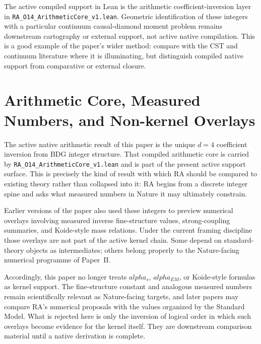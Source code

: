 \documentclass[11pt]{article}
\def\alpha{alpha}%
\def\mathrm#1{#1}%
\begin{document}
The active compiled support in Lean is the arithmetic coefficient-inversion layer in \texttt{RA\_O14\_ArithmeticCore\_v1.lean}. Geometric identification of these integers with a particular continuum causal-diamond moment problem remains downstream cartography or external support, not active native compilation. This is a good example of the paper's wider method: compare with the CST and continuum literature where it is illuminating, but distinguish compiled native support from comparative or external closure.

\section{Arithmetic Core, Measured Numbers, and Non-kernel Overlays}
\label{sec:couplings}

The active native arithmetic result of this paper is the unique $d=4$ coefficient inversion from BDG integer structure. That compiled arithmetic core is carried by \texttt{RA\_O14\_ArithmeticCore\_v1.lean} and is part of the present active support surface. This is precisely the kind of result with which RA should be compared to existing theory rather than collapsed into it: RA begins from a discrete integer spine and asks what measured numbers in Nature it may ultimately constrain.

Earlier versions of the paper also used these integers to preview numerical overlays involving measured inverse fine-structure values, strong-coupling summaries, and Koide-style mass relations. Under the current framing discipline those overlays are not part of the active kernel chain. Some depend on standard-theory objects as intermediates; others belong properly to the Nature-facing numerical programme of Paper~II.

Accordingly, this paper no longer treats $\alpha_s$, $\alpha_{\mathrm{EM}}$, or Koide-style formulas as kernel support. The fine-structure constant and analogous measured numbers remain scientifically relevant as Nature-facing targets, and later papers may compare RA's numerical proposals with the values organized by the Standard Model. What is rejected here is only the inversion of logical order in which such overlays become evidence for the kernel itself. They are downstream comparison material until a native derivation is complete.

\end{document}
